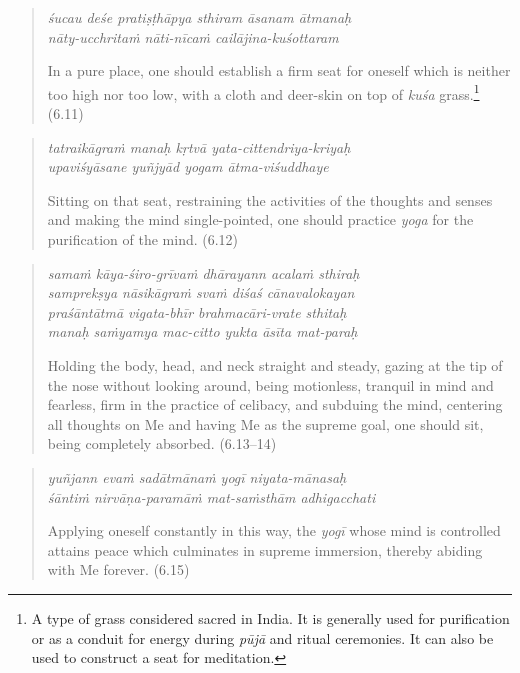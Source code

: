 \documentclass[12pt, twoside, openright]{memoir}
\begin{document}
\par
\begin{verse}
\textit{śucau deśe pratiṣṭhāpya sthiram āsanam ātmanaḥ} \\
\textit{nāty-ucchritaṁ nāti-nīcaṁ cailājina-kuśottaram}

\noindent In a pure place, one should establish a firm seat for oneself which is neither too high nor too low, with a cloth and deer-skin on top of \textit{kuśa} grass.\footnote{A type of grass considered sacred in India. It is generally used for purification or as a conduit for energy during \textit{pūjā} and ritual ceremonies. It can also be used to construct a seat for meditation.} (6.11)
\end{verse}
\par



\par
\begin{verse}
\textit{tatraikāgraṁ manaḥ kṛtvā yata-cittendriya-kriyaḥ} \\
\textit{upaviśyāsane yuñjyād yogam ātma-viśuddhaye}

\noindent Sitting on that seat, restraining the activities of the thoughts and senses and making the mind single-pointed, one should practice \textit{yoga} for the purification of the mind. (6.12)
\end{verse}
\par



\par
\begin{verse}
\textit{samaṁ kāya-śiro-grīvaṁ dhārayann acalaṁ sthiraḥ} \\
\textit{samprekṣya nāsikāgraṁ svaṁ diśaś cānavalokayan} \\
\textit{praśāntātmā vigata-bhīr brahmacāri-vrate sthitaḥ} \\
\textit{manaḥ saṁyamya mac-citto yukta āsīta mat-paraḥ}

\noindent Holding the body, head, and neck straight and steady, gazing at the tip of the nose without looking around, being motionless, tranquil in mind and fearless, firm in the practice of celibacy, and subduing the mind, centering all thoughts on Me and having Me as the supreme goal, one should sit, being completely absorbed. (6.13–14)
\end{verse}
\par



\par
\begin{verse}
\textit{yuñjann evaṁ sadātmānaṁ yogī niyata-mānasaḥ} \\
\textit{śāntiṁ nirvāṇa-paramāṁ mat-saṁsthām adhigacchati}

\noindent Applying oneself constantly in this way, the \textit{yogī} whose mind is controlled attains peace which culminates in supreme immersion, thereby abiding with Me forever. (6.15)
\end{verse}
\par
\end{document}
